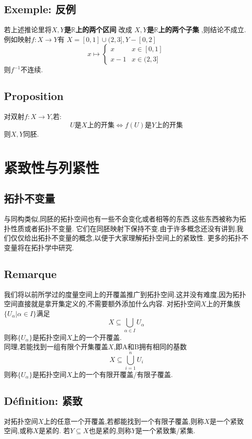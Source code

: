\documentclass[12pt, a4paper, oneside]{ctexbook}
\begin{document}
  \subsection{Exemple: 反例}
  若上述推论里将\textbf{$X,Y$是$\mathbb{R}$上的两个区间} 改成 \textbf{$X,Y$是$\mathbb{R}$上的两个子集} ,则结论不成立.
  例如映射$f:X\rightarrow Y$有 $X=[0,1]\cup(2,3],Y-[0,2]$
  $$
  x\mapsto 
  \begin{cases}
    x &x\in[0,1]\\
    x-1 &x\in (2,3]
    \end{cases}
  $$
  则$f^{-1}$不连续.
  \subsection{Proposition}
  对双射$f:X\rightarrow Y$,若:
  $$
  U\text{是$X$上的开集}\Leftrightarrow f(U)\text{是$Y$上的开集}
  $$
  则$X,Y$同胚.

  \section{紧致性与列紧性}
  \subsection{拓扑不变量}
  与同构类似,同胚的拓扑空间也有一些不会变化或者相等的东西.这些东西被称为拓扑性质或者拓扑不变量.
  它们在同胚映射下保持不变.由于许多概念还没有讲到,我们仅仅给出拓扑不变量的概念,以便于大家理解拓扑空间上的紧致性.
  更多的拓扑不变量将在拓扑学中研究.
  \subsection{Remarque}
  我们将以前所学过的度量空间上的开覆盖推广到拓扑空间.这并没有难度,因为拓扑空间直接就是拿开集定义的,不需要额外添加什么内容.
  对拓扑空间$X$上的开集族$\{U_\alpha|\alpha\in I \}$满足
  $$
    X\subseteq \bigcup_{\alpha\in I}U_\alpha
  $$则称$\{U_\alpha\}$是拓扑空间$X$上的一个开覆盖.\\

  同理,若能找到一组有限个开集覆盖$X$,即A和B拥有相同的基数
  $$
  X\subseteq \bigcup_{i=1}^{n}U_i
  $$则称$\{U_\alpha\}$是拓扑空间$X$上的一个有限开覆盖/有限子覆盖.
  \subsection{Définition: 紧致}
  对拓扑空间$X$上的任意一个开覆盖,若都能找到一个有限子覆盖,则称$X$是一个紧致空间,或称$X$是紧的.
  若$Y\subseteq X$也是紧的,则称$Y$是一个紧致集/紧集.
\end{document}
